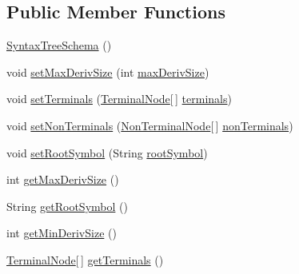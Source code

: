 \subsection*{Public Member Functions}
\begin{DoxyCompactItemize}
\item 
\hyperlink{classnet_1_1sf_1_1jclec_1_1syntaxtree_1_1_syntax_tree_schema_af7c935a010de17296f037660fe17959d}{Syntax\-Tree\-Schema} ()
\item 
void \hyperlink{classnet_1_1sf_1_1jclec_1_1syntaxtree_1_1_syntax_tree_schema_aa1697a0fcb9cdd4239c272cadf6f707d}{set\-Max\-Deriv\-Size} (int \hyperlink{classnet_1_1sf_1_1jclec_1_1syntaxtree_1_1_syntax_tree_schema_a6f8c08c9aac2df7a5e3423cad6a25f4f}{max\-Deriv\-Size})
\item 
void \hyperlink{classnet_1_1sf_1_1jclec_1_1syntaxtree_1_1_syntax_tree_schema_a64894d1775707a758e7530bc3ad37403}{set\-Terminals} (\hyperlink{classnet_1_1sf_1_1jclec_1_1syntaxtree_1_1_terminal_node}{Terminal\-Node}\mbox{[}$\,$\mbox{]} \hyperlink{classnet_1_1sf_1_1jclec_1_1syntaxtree_1_1_syntax_tree_schema_adb1b36c1f168bd3f87dad9e1f40e7c4d}{terminals})
\item 
void \hyperlink{classnet_1_1sf_1_1jclec_1_1syntaxtree_1_1_syntax_tree_schema_a6a0f8e5dbc7fe09076993dec520c5b61}{set\-Non\-Terminals} (\hyperlink{classnet_1_1sf_1_1jclec_1_1syntaxtree_1_1_non_terminal_node}{Non\-Terminal\-Node}\mbox{[}$\,$\mbox{]} \hyperlink{classnet_1_1sf_1_1jclec_1_1syntaxtree_1_1_syntax_tree_schema_a9029c7ded48bc795194faff53e13c2b2}{non\-Terminals})
\item 
void \hyperlink{classnet_1_1sf_1_1jclec_1_1syntaxtree_1_1_syntax_tree_schema_a547942c653bf6e9f7412949ff9a9294f}{set\-Root\-Symbol} (String \hyperlink{classnet_1_1sf_1_1jclec_1_1syntaxtree_1_1_syntax_tree_schema_aab4ff6d931566275df40f10f0a38f3ba}{root\-Symbol})
\item 
int \hyperlink{classnet_1_1sf_1_1jclec_1_1syntaxtree_1_1_syntax_tree_schema_ac5114909242387b97a62c9767ee2e8c1}{get\-Max\-Deriv\-Size} ()
\item 
String \hyperlink{classnet_1_1sf_1_1jclec_1_1syntaxtree_1_1_syntax_tree_schema_a1ea9913889c71cf0eee9475e6acca09b}{get\-Root\-Symbol} ()
\item 
int \hyperlink{classnet_1_1sf_1_1jclec_1_1syntaxtree_1_1_syntax_tree_schema_adf8d34b11cf858fefd181e40bb818515}{get\-Min\-Deriv\-Size} ()
\item 
\hyperlink{classnet_1_1sf_1_1jclec_1_1syntaxtree_1_1_terminal_node}{Terminal\-Node}\mbox{[}$\,$\mbox{]} \hyperlink{classnet_1_1sf_1_1jclec_1_1syntaxtree_1_1_syntax_tree_schema_a6415e8fd79d035f608c40af87e408379}{get\-Terminals} ()

\end{DoxyCompactItemize}
